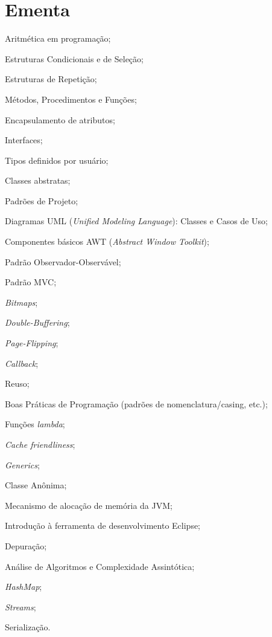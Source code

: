 \documentclass{article}
\begin{document}
\section{Ementa}
\begin{itemize*}[label={}]
     \item Aritmética em programação; %
     \item Estruturas Condicionais e de Seleção; %
     \item Estruturas de Repetição; %
     \item Métodos, Procedimentos e Funções; %
     \item Encapsulamento de atributos; %
     \item Interfaces; %
     \item Tipos definidos por usuário; %
     \item Classes abstratas; %
     \item Padrões de Projeto; %
     \item Diagramas UML (\textit{Unified Modeling Language}): Classes
         e Casos de Uso; %
     \item Componentes básicos AWT (\textit{Abstract Window Toolkit}); %
     \item Padrão Observador-Observável; %
     \item Padrão MVC\@; %
     \item \textit{Bitmaps}; %
     \item \textit{Double-Buffering}; %
     \item \textit{Page-Flipping}; %
     \item \textit{Callback}; %
     \item Reuso; %
     \item Boas Práticas de Programação (padrões de nomenclatura/casing, etc.); %
     \item Funções \textit{lambda}; %
     \item \textit{Cache friendliness}; %
     \item \textit{Generics}; %
     \item Classe Anônima; %
     \item Mecanismo de alocação de memória da JVM\@; %
     \item Introdução à ferramenta de desenvolvimento Eclipse; %
     \item Depuração; %
     \item Análise de Algoritmos e Complexidade Assintótica; %
     \item \textit{HashMap}; %
     \item \textit{Streams}; %
     \item Serialização. %
\end{itemize*}
\end{document}
